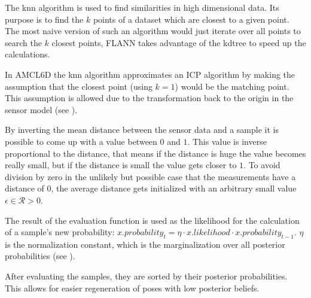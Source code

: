 \documentclass[Thesis.tex]{subfiles}
\begin{document}
The \gls{knn} algorithm is used to find similarities in high dimensional data\cite{flann_pami_2014}. Its purpose is to find the $k$ points of a dataset which are closest to a given point. The most naive version of such an algorithm would just iterate over all points to search the $k$ closest points, \gls{FLANN} takes advantage of the \gls{kdtree} to speed up the calculations. 

In \gls{AMCL6D} the \gls{knn} algorithm approximates an \gls{ICP} algorithm by making the assumption that the closest point (using $k=1$) would be the matching point. This assumption is allowed due to the transformation back to the origin in the sensor model (see ). 

By inverting the mean distance between the sensor data and a sample it is possible to come up with a value between $0$ and $1$. This value is inverse proportional to the distance, that means if the distance is huge the value becomes really small, but if the distance is small the value gets closer to $1$. To avoid division by zero in the unlikely but possible case that the measurements have a distance of $0$, the average distance gets initialized with an arbitrary small value $\epsilon \in \mathcal{R} > 0$.

The result of the evaluation function is used as the likelihood for the calculation of a sample's new probability: $x.probability_t = \eta \cdot x.likelihood \cdot x.probability_{t-1}$. $\eta$ is the normalization constant, which is the marginalization over all posterior probabilities (see ).

\smallskip

After evaluating the samples, they are sorted by their posterior probabilities. This allows for easier regeneration of poses with low posterior beliefs.
\end{document}
